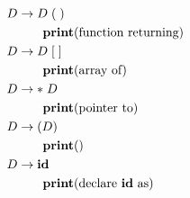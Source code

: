 
\setcounter{equation}{0}
\begin{align}
	D &\to D\;(\;) \\
	  &\qquad \text{\text{\bf print}(function returning)} \notag\\
	D &\to D\;[\;] \\
	  &\qquad \text{\text{\bf print}(array of)} \notag\\
	D &\to *\;D 	 \\
	  &\qquad \text{\text{\bf print}(pointer to)} \notag\\
	D &\to (D)		 \\
	  &\qquad \text{\text{\bf print}()} \notag\\
	D &\to \text{\bf id} \\
		&\qquad \text{\text{\bf print}(declare \text{\bf id}{} as)} \notag
\end{align}